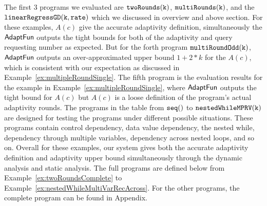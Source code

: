 The first 3 programs we evaluated are $\mathtt{twoRounds(k)}$, $ \mathtt{multiRounds(k)}$, 
and the $\mathtt{linearRegressGD(k, rate)}$ which we discussed in overview and above section.
For these examples, $A(c)$ 
give the accurate adaptivity definition, 
simultaneously the $\textsf{AdaptFun}$ outputs the tight bounds for both of the adaptivity and query requesting number as expected.
But for the forth program $\mathtt{multiRoundOdd(k)}$, $\textsf{AdaptFun}$ outputs an over-approximated upper bound $1 + 2*k$ for the $A(c)$, 
which is consistent with our expectation as discussed in Example~\ref{ex:multipleRoundSingle}. 
The fifth program is the evaluation results for the example in Example~\ref{ex:multipleRoundSingle}, where $\textsf{AdaptFun}$ outputs
the tight bound for $A(c)$ but $A(c)$ is a loose definition of the program's actual adaptivity rounds.
%
The programs in the table from  $\mathtt{seq()}$ to $ \mathtt{nestedWhileMPRV(k)}$ are 
designed for testing the programs under different possible situations.
These programs contain control dependency, data value dependency,
the nested while, dependency through multiple variables, dependency across nested loops, and so on. 
Overall for these examples, our system gives both the accurate adaptivity definition and 
adaptivity upper bound simultaneously through the dynamic analysis and 
static analysis.
The full programs are defined below from Example~\ref{ex:twoRoundsComplete} to Example~\ref{ex:nestedWhileMultiVarRecAcross}.
%
For the other programs, the complete program can be found in Appendix.
